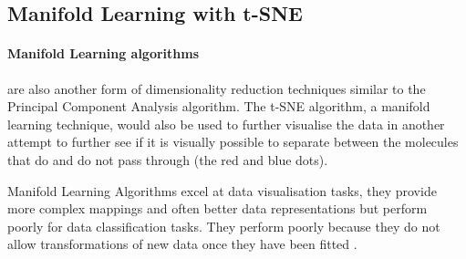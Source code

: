 \documentclass[a4paper,12pt]{report}
\begin{document}
	
	
		\subsection{Manifold Learning with t-SNE}
		\paragraph{Manifold Learning algorithms} are also another form of dimensionality reduction techniques similar to the Principal Component Analysis algorithm. The t-SNE algorithm, a manifold learning technique, would also be used to further visualise the data in another attempt to further see if it is visually possible to separate between the molecules that do and do not pass through (the red and blue dots). 
		
		Manifold Learning Algorithms excel at data visualisation tasks, they provide more complex mappings and often better data representations but perform poorly for data classification tasks. They perform poorly because they do not allow transformations of new data once they have been fitted \cite{Yairetal2008}.\\
		
\end{document}
